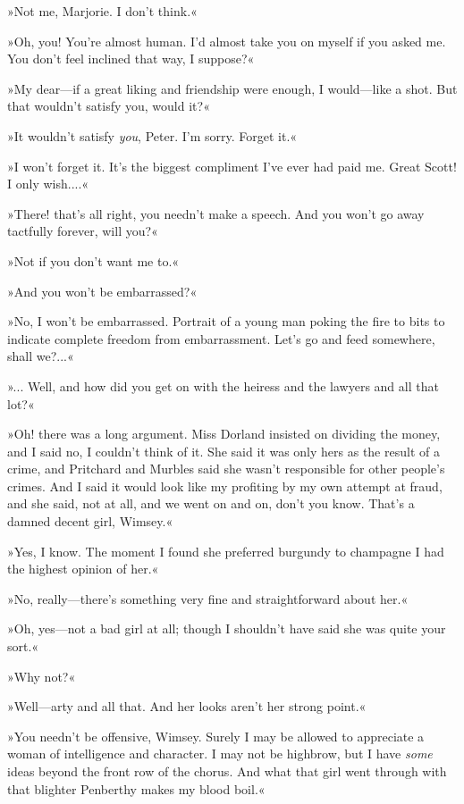 »Not me, Marjorie. I don't think.«

»Oh, you! You're almost human. I'd almost take you on myself if you asked me. You don't feel inclined that way, I suppose?«

»My dear—if a great liking and friendship were enough, I would—like a shot. But that wouldn't satisfy you, would it?«

»It wouldn't satisfy \textit{you}, Peter. I'm sorry. Forget it.«

»I won't forget it. It's the biggest compliment I've ever had paid me. Great Scott! I only wish....«

»There! that's all right, you needn't make a speech. And you won't go away tactfully forever, will you?«

»Not if you don't want me to.«

»And you won't be embarrassed?«

»No, I won't be embarrassed. Portrait of a young man poking the fire to bits to indicate complete freedom from embarrassment. Let's go and feed somewhere, shall we?...«

»... Well, and how did you get on with the heiress and the lawyers and all that lot?«

»Oh! there was a long argument. Miss Dorland insisted on dividing the money, and I said no, I couldn't think of it. She said it was only hers as the result of a crime, and Pritchard and Murbles said she wasn't responsible for other people's crimes. And I said it would look like my profiting by my own attempt at fraud, and she said, not at all, and we went on and on, don't you know. That's a damned decent girl, Wimsey.«

»Yes, I know. The moment I found she preferred burgundy to champagne I had the highest opinion of her.«

»No, really—there's something very fine and straightforward about her.«

»Oh, yes—not a bad girl at all; though I shouldn't have said she was quite your sort.«

»Why not?«

»Well—arty and all that. And her looks aren't her strong point.«

»You needn't be offensive, Wimsey. Surely I may be allowed to appreciate a woman of intelligence and character. I may not be highbrow, but I have \textit{some} ideas beyond the front row of the chorus. And what that girl went through with that blighter Penberthy makes my blood boil.«

